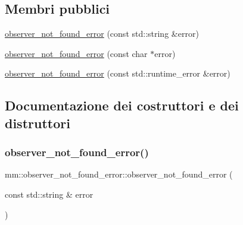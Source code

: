 \subsection*{Membri pubblici}
\begin{DoxyCompactItemize}
\item 
\hyperlink{classmm_1_1observer__not__found__error_a967227c100638d8d978f8ee3dd6c70b4}{observer\+\_\+not\+\_\+found\+\_\+error} (const std\+::string \&error)
\item 
\hyperlink{classmm_1_1observer__not__found__error_a7bf8977aad52f25ac981ec9b7c961ba0}{observer\+\_\+not\+\_\+found\+\_\+error} (const char $\ast$error)
\item 
\hyperlink{classmm_1_1observer__not__found__error_a60ab7d1412fcd906c7976e686f9b936b}{observer\+\_\+not\+\_\+found\+\_\+error} (const std\+::runtime\+\_\+error \&error)
\end{DoxyCompactItemize}


\subsection{Documentazione dei costruttori e dei distruttori}
\mbox{\label{classmm_1_1observer__not__found__error_a967227c100638d8d978f8ee3dd6c70b4}} 
\subsubsection{\texorpdfstring{observer\+\_\+not\+\_\+found\+\_\+error()}{observer\_not\_found\_error()}\hspace{0.1cm}{\footnotesize\ttfamily [1/3]}}
{\footnotesize\ttfamily mm\+::observer\+\_\+not\+\_\+found\+\_\+error\+::observer\+\_\+not\+\_\+found\+\_\+error (\begin{DoxyParamCaption}\item[{const std\+::string \&}]{error }\end{DoxyParamCaption})}

\mbox{\label{classmm_1_1observer__not__found__error_a7bf8977aad52f25ac981ec9b7c961ba0}} 
